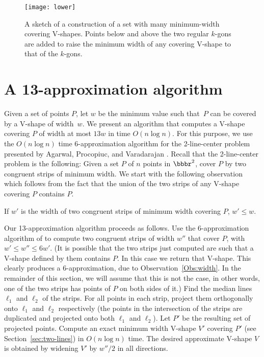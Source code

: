 \documentclass{llncs}
\begin{document}
\begin{figure}
  \centering
  \texttt{[image: lower]}
  \caption{A sketch of a construction of a set with many minimum-width
    covering V-shapes.  Points below and above the two regular
    $k$-gons are added to raise the minimum width of any covering
    V-shape to that of the $k$-gons.}
  \label{fig:lower}
\end{figure}


\section{A 13-approximation algorithm}
\label{sec:13-approx}

Given a set of points $P$, let $w$ be the minimum value such that~$P$
can be covered by a V-shape of width~$w$.
We present an algorithm that computes a V-shape covering $P$ of width at most $13 w$ in time $O(n \log n)$.
For this purpose, we use the $O(n \log n)$ time 6-approximation algorithm for the 2-line-center problem  presented by Agarwal, Procopiuc, and Varadarajan \cite{2-line-center}.
Recall that the 2-line-center problem is the following: Given a set $P$ of $n$
points in $\bbbr^2$, cover $P$ by two congruent strips of minimum
width.  We start with the following observation which follows from the
fact that the union of the two strips of any V-shape covering $P$ contains $P$.

\begin{observation}
  \label{Obs:width}
  If $w'$ is the width of two congruent strips of minimum width covering $P$, $w' \leq w$.
\end{observation}


Our 13-approximation algorithm proceeds as follows.  Use the 6-approximation
algorithm of \cite{2-line-center} to compute two congruent
strips of width $w''$ that cover $P$, with $w' \leq w'' \leq 6w'$.
(It is possible that the two strips just computed are such
that a V-shape defined by them contains $P$.  In this case we return
that V-shape.  This clearly produces a 6-approximation, due to
Observation~\ref{Obs:width}.  In the remainder of this section, we
will assume that this is not the case, in other words, one of the two
strips has points of $P$ on both sides of it.)
Find the median lines $\ell_1$ and $\ell_2$ of
the strips.  For all points in each strip, project them orthogonally
onto $\ell_1$
and $\ell_2$ respectively (the points in the intersection of the
strips are duplicated and projected onto both $\ell_1$ and $\ell_2$).
Let $P'$ be the resulting set of projected points.  Compute an exact
minimum width V-shape $V'$ covering $P'$ (see Section~\ref{sec:two-lines})
in $O(n \log n )$ time.  The desired approximate V-shape $V$ is
obtained by widening $V'$ by $w''/2$ in all directions.
\end{document}
